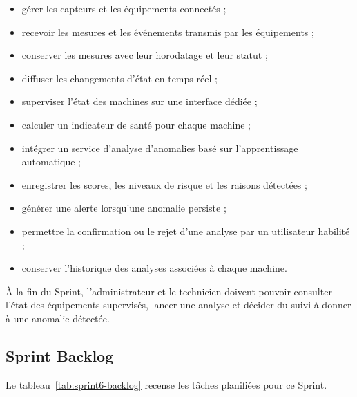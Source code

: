 \begin{itemize}
    \item gérer les capteurs et les équipements connectés ;
    \item recevoir les mesures et les événements transmis par les équipements ;
    \item conserver les mesures avec leur horodatage et leur statut ;
    \item diffuser les changements d'état en temps réel ;
    \item superviser l'état des machines sur une interface dédiée ;
    \item calculer un indicateur de santé pour chaque machine ;
    \item intégrer un service d'analyse d'anomalies basé sur l'apprentissage automatique ;
    \item enregistrer les scores, les niveaux de risque et les raisons détectées ;
    \item générer une alerte lorsqu'une anomalie persiste ;
    \item permettre la confirmation ou le rejet d'une analyse par un utilisateur habilité ;
    \item conserver l'historique des analyses associées à chaque machine.
\end{itemize}

À la fin du Sprint, l'administrateur et le technicien doivent pouvoir consulter l'état des équipements supervisés, lancer une analyse et décider du suivi à donner à une anomalie détectée.

\subsection{Sprint Backlog}

Le tableau~\ref{tab:sprint6-backlog} recense les tâches planifiées pour ce Sprint.


